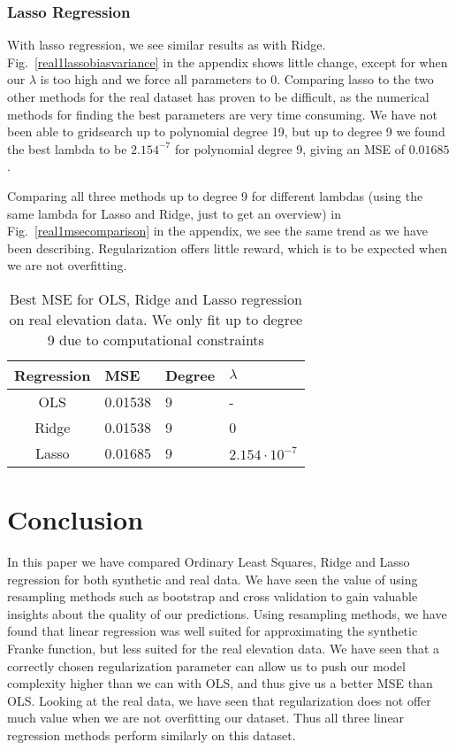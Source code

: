 \documentclass[onecolumn,10pt,cleanfoot]{asme2ej}
\begin{document}
\subsubsection{Lasso Regression}

With lasso regression, we see similar results as with Ridge. Fig.~\ref{real1lassobiasvariance} in the appendix shows little change, except for when our $\lambda$ is too high and we force all parameters to $0$. Comparing lasso to the two other methods for the real dataset has proven to be difficult, as the numerical methods for finding the best parameters are very time consuming. We have not been able to gridsearch up to polynomial degree 19, but up to degree 9 we found the best lambda to be $2.154^{-7}$ for polynomial degree 9, giving an MSE of $0.01685$.

Comparing all three methods up to degree 9 for different lambdas (using the same lambda for Lasso and Ridge, just to get an overview) in Fig.~\ref{real1msecomparison} in the appendix, we see the same trend as we have been describing. Regularization offers little reward, which is to be expected when we are not overfitting.


\begin{table*}[t]
\caption{Best MSE for OLS, Ridge and Lasso regression on real elevation data. We only fit up to degree 9 due to computational constraints}
\begin{center}
\label{ols_vs_ridge_vs_lasso_table_real}
\begin{tabular}{c | l l l}
Regression & MSE & Degree & $\lambda$ \\
\hline
OLS & 0.01538 & 9 & - \\
Ridge & 0.01538 & 9 & 0 \\
Lasso & 0.01685 & 9 & $2.154 \cdot 10^{-7}$ \\
\hline
\end{tabular}
\end{center}
\end{table*}

\section{Conclusion}

In this paper we have compared Ordinary Least Squares, Ridge and Lasso regression for both synthetic and real data. We have seen the value of using resampling methods such as bootstrap and cross validation to gain valuable insights about the quality of our predictions. Using resampling methods, we have found that linear regression was well suited for approximating the synthetic Franke function, but less suited for the real elevation data. We have seen that a correctly chosen regularization parameter can allow us to push our model complexity higher than we can with OLS, and thus give us a better MSE than OLS. Looking at the real data, we have seen that regularization does not offer much value when we are not overfitting our dataset. Thus all three linear regression methods perform similarly on this dataset. 
\end{document}
